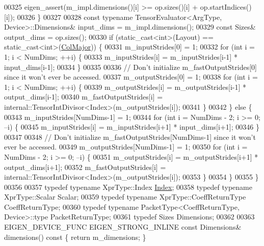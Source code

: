 \begin{DoxyCode}
00325       eigen\_assert(m\_impl.dimensions()[i] >= op.sizes()[i] + op.startIndices()[i]);
00326     \}
00327 
00328     \textcolor{keyword}{const} \textcolor{keyword}{typename} TensorEvaluator<ArgType, Device>::Dimensions& input\_dims = m\_impl.dimensions();
00329     \textcolor{keyword}{const} Sizes& output\_dims = op.sizes();
00330     \textcolor{keywordflow}{if} (static\_cast<int>(Layout) == static\_cast<int>(\hyperlink{group__enums_ggaacded1a18ae58b0f554751f6cdf9eb13a0cbd4bdd0abcfc0224c5fcb5e4f6669a}{ColMajor})) \{
00331       m\_inputStrides[0] = 1;
00332       \textcolor{keywordflow}{for} (\textcolor{keywordtype}{int} i = 1; i < NumDims; ++i) \{
00333         m\_inputStrides[i] = m\_inputStrides[i-1] * input\_dims[i-1];
00334       \}
00335 
00336      \textcolor{comment}{// Don't initialize m\_fastOutputStrides[0] since it won't ever be accessed.}
00337       m\_outputStrides[0] = 1;
00338       \textcolor{keywordflow}{for} (\textcolor{keywordtype}{int} i = 1; i < NumDims; ++i) \{
00339         m\_outputStrides[i] = m\_outputStrides[i-1] * output\_dims[i-1];
00340         m\_fastOutputStrides[i] = internal::TensorIntDivisor<Index>(m\_outputStrides[i]);
00341       \}
00342     \} \textcolor{keywordflow}{else} \{
00343       m\_inputStrides[NumDims-1] = 1;
00344       \textcolor{keywordflow}{for} (\textcolor{keywordtype}{int} i = NumDims - 2; i >= 0; --i) \{
00345         m\_inputStrides[i] = m\_inputStrides[i+1] * input\_dims[i+1];
00346       \}
00347 
00348      \textcolor{comment}{// Don't initialize m\_fastOutputStrides[NumDims-1] since it won't ever be accessed.}
00349       m\_outputStrides[NumDims-1] = 1;
00350       \textcolor{keywordflow}{for} (\textcolor{keywordtype}{int} i = NumDims - 2; i >= 0; --i) \{
00351         m\_outputStrides[i] = m\_outputStrides[i+1] * output\_dims[i+1];
00352         m\_fastOutputStrides[i] = internal::TensorIntDivisor<Index>(m\_outputStrides[i]);
00353       \}
00354     \}
00355   \}
00356 
00357   \textcolor{keyword}{typedef} \textcolor{keyword}{typename} XprType::Index \hyperlink{namespace_eigen_a62e77e0933482dafde8fe197d9a2cfde}{Index};
00358   \textcolor{keyword}{typedef} \textcolor{keyword}{typename} XprType::Scalar Scalar;
00359   \textcolor{keyword}{typedef} \textcolor{keyword}{typename} XprType::CoeffReturnType CoeffReturnType;
00360   \textcolor{keyword}{typedef} \textcolor{keyword}{typename} PacketType<CoeffReturnType, Device>::type PacketReturnType;
00361   \textcolor{keyword}{typedef} Sizes Dimensions;
00362 
00363   EIGEN\_DEVICE\_FUNC EIGEN\_STRONG\_INLINE \textcolor{keyword}{const} Dimensions& dimensions()\textcolor{keyword}{ const }\{ \textcolor{keywordflow}{return} m\_dimensions; \}

\end{DoxyCode}
